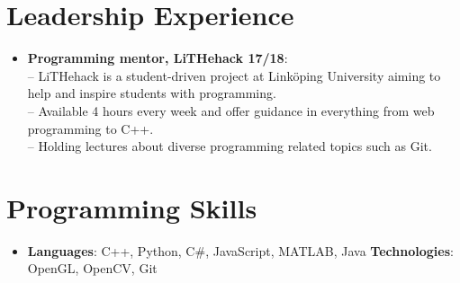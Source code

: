 \documentclass[letterpaper,11pt]{article}
\newcommand{\resumeItem}[2]{
  \item\small{
    \textbf{#1}{: #2 \vspace{-2pt}}
  }
}
\newcommand{\resumeSubItem}[2]{\resumeItem{#1}{#2}\vspace{-4pt}}
\newcommand{\resumeSubHeadingListStart}{\begin{itemize}[leftmargin=*]}
\newcommand{\resumeSubHeadingListEnd}{\end{itemize}}
\begin{document}
\section{Leadership Experience}
  \resumeSubHeadingListStart
    \resumeSubItem{Programming mentor, LiTHehack 17/18}
      {\\
      \indent-- LiTHehack is a student-driven project at Linköping University aiming to help and inspire students with programming. \\
      \indent-- Available 4 hours every week and offer guidance in everything from web programming to C++.\\
      \indent-- Holding lectures about diverse programming related topics such as Git.\\}
      
    \resumeSubHeadingListEnd
  
\section{Programming Skills}
  \resumeSubHeadingListStart
    \item{
      \textbf{Languages}{: C++, Python, C\#, JavaScript, MATLAB, Java}
      \hfill
      \textbf{Technologies}{: OpenGL, OpenCV, Git}
    }
  \resumeSubHeadingListEnd
\end{document}
